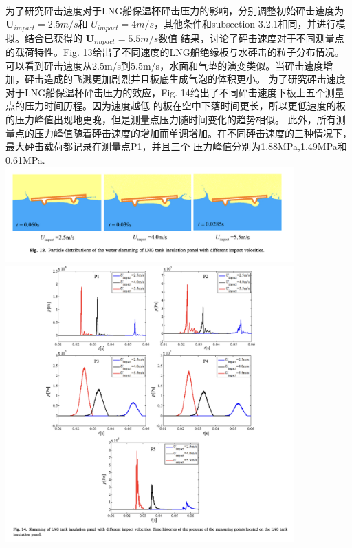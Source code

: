 \documentclass[UTF8]{ctexart}
\begin{document}
\paragraph{\quad}为了研究砰击速度对于LNG船保温杯砰击压力的影响，分别调整初始砰击速度为 $\mathbf{U}_{impact} = 2.5m/s$和 
                $U_{impact} = 4m/s$，其他条件和subsection 3.2.1相同，并进行模拟。结合已获得的 $\mathbf{U}_{impact} = 5.5m/s$数值
                结果，讨论了砰击速度对于不同测量点的载荷特性。Fig. 13给出了不同速度的LNG船绝缘板与水砰击的粒子分布情况。
                可以看到砰击速度从2.5m/s到5.5m/s，水面和气垫的演变类似。当砰击速度增加，砰击造成的飞溅更加剧烈并且板底生成气泡的体积更小。
                为了研究砰击速度对于LNG船保温杯砰击压力的效应，Fig. 14给出了不同砰击速度下板上五个测量点的压力时间历程。因为速度越低
                的板在空中下落时间更长，所以更低速度的板的压力峰值出现地更晚，但是测量点压力随时间变化的趋势相似。
                此外，所有测量点的压力峰值随着砰击速度的增加而单调增加。在不同砰击速度的三种情况下，最大砰击载荷都记录在测量点P1，并且三个
                压力峰值分别为1.88MPa,1.49MPa和0.61MPa.\\
{
    \centering
    \includegraphics[width=30em]{./source/Fig13.png} \\
    \includegraphics[width=30em]{./source/Fig14.png}
}
\end{document}
